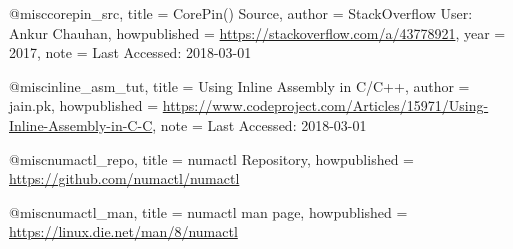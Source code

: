 @misc{corepin_src,
    title = {CorePin() Source},
    author = {StackOverflow User: Ankur Chauhan},
    howpublished = {\url{https://stackoverflow.com/a/43778921}},
    year = {2017},
    note = {Last Accessed: 2018-03-01}
}

@misc{inline_asm_tut,
    title = {Using Inline Assembly in C/C++},
    author = {jain.pk},
    howpublished = {\url{https://www.codeproject.com/Articles/15971/Using-Inline-Assembly-in-C-C}},
    note = {Last Accessed: 2018-03-01}
}

@misc{numactl_repo,
    title        = {numactl Repository},
    howpublished = {\url{https://github.com/numactl/numactl}}
}

@misc{numactl_man,
    title        = {numactl man page},
    howpublished = {\url{https://linux.die.net/man/8/numactl}}
}